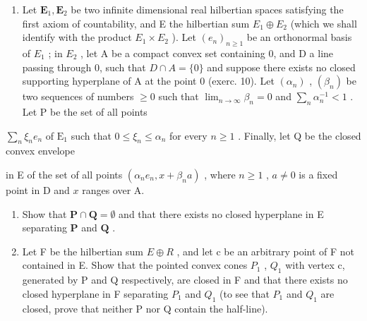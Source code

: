 \begin{enumerate}
\def\labelenumi{\arabic{enumi})}
\setcounter{enumi}{10}
\tightlist
\item
  Let \(\mathbf{E}_1, \mathbf{E}_2\) be two infinite dimensional real hilbertian spaces satisfying the first axiom of countability, and E the hilbertian sum \(E_{1} \oplus E_{2}\) (which we shall identify with the product \(E_{1} \times E_{2}\) ). Let \((e_{n})_{n \geqslant 1}\) be an orthonormal basis of \(E_{1}\) ; in \(E_{2}\) , let A be a compact convex set containing 0, and D a line passing through 0, such that \(D \cap A = \{0\}\) and suppose there exists no closed supporting hyperplane of A at the point 0 (exerc. 10). Let \((\alpha_{n})\) , \((\beta_{n})\) be two sequences of numbers \(\geqslant 0\) such that \(\lim_{n \to \infty} \beta_{n} = 0\) and \(\sum_{n} \alpha_{n}^{-1} < 1\) . Let P be the set of all points
\end{enumerate}

\(\sum_{n}\xi_{n}e_{n}\) of \(\mathrm{E}_1\) such that \(0\leqslant \xi_n\leqslant \alpha_n\) for every \(n\geqslant 1\) . Finally, let Q be the closed convex envelope

in E of the set of all points \((\alpha_{n}e_{n}, x + \beta_{n}a)\) , where \(n \geqslant 1\) , \(a \neq 0\) is a fixed point in D and \(x\) ranges over A.

\begin{enumerate}
\def\labelenumi{\alph{enumi})}
\item
  Show that \(\mathbf{P} \cap \mathbf{Q} = \emptyset\) and that there exists no closed hyperplane in E separating \(\mathbf{P}\) and \(\mathbf{Q}\) .
\item
  Let F be the hilbertian sum \(E \oplus R\) , and let c be an arbitrary point of F not contained in E. Show that the pointed convex cones \(P_{1}\) , \(Q_{1}\) with vertex c, generated by P and Q respectively, are closed in F and that there exists no closed hyperplane in F separating \(P_{1}\) and \(Q_{1}\) (to see that \(P_{1}\) and \(Q_{1}\) are closed, prove that neither P nor Q contain the half-line).
\end{enumerate}

